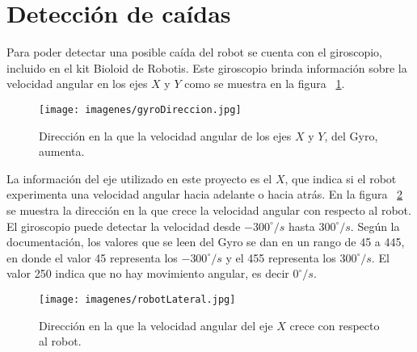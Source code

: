 \section{Detecci\'on de ca\'idas}

Para poder detectar una posible caída del robot se cuenta con el giroscopio, incluido en el kit Bioloid de Robotis. Este giroscopio brinda información sobre la velocidad angular en los ejes $X$ y $Y$ como se muestra en la figura ~\ref{fig:gyroDireccion}.

\begin{figure}[hbtp]
\centering
\texttt{[image: imagenes/gyroDireccion.jpg]}
\caption{Dirección en la que la velocidad angular de los ejes $X$ y $Y$, del Gyro, aumenta.}
\label{fig:gyroDireccion}
\end{figure}

La información del eje utilizado en este proyecto es el $X$, que indica si el robot experimenta una velocidad angular hacia adelante o hacia atrás. En la figura ~\ref{fig:gyroDireccion1} se muestra la direcci\'on en la que crece la velocidad angular con respecto al robot. El giroscopio puede detectar la velocidad desde $-300^{\circ}/s$ hasta $300^{\circ} /s$. Según la documentación, los valores que se leen del Gyro se dan en un rango de 45 a 445, en donde el valor 45 representa los $-300^{\circ}/s$ y el 455 representa los $300^{\circ} /s$. El valor 250 indica que no hay movimiento angular, es decir $0^{\circ}/s$. %

\begin{figure}[hbtp]
\centering
\texttt{[image: imagenes/robotLateral.jpg]}
\caption{Dirección en la que la velocidad angular del eje $X$ crece con respecto al robot.}
\label{fig:gyroDireccion1}
\end{figure}


